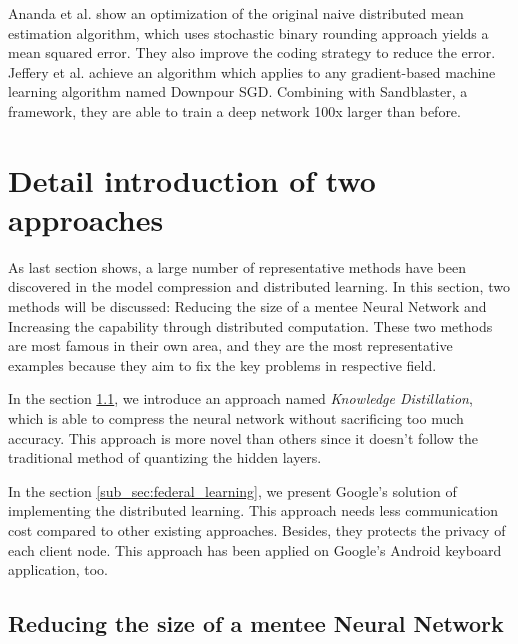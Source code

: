 \documentclass[article]{aaltoseries}
\begin{document}
Ananda et al.\cite{Suresh2016} show an optimization of the original naive distributed mean estimation algorithm, which uses 
stochastic binary rounding approach yields a mean squared error. They also improve the coding strategy to reduce the error.
Jeffery et al.\cite{NIPS2012_4687} achieve an algorithm which applies to any gradient-based 
machine learning algorithm named Downpour SGD.
Combining with Sandblaster, a framework, they are able to train a deep network 100x larger than before.







\section{Detail introduction of two approaches}
\label{sec:approaches}





As last section shows, a large number of representative methods have been discovered in the model compression and distributed learning. 
In this section, two methods will be discussed:
Reducing the size of a mentee Neural Network and Increasing the capability through distributed computation.
These two methods are most famous in their own area, and they are the most representative examples because they
aim to fix the key problems in respective field.

In the section \ref{sub_sec:reduce_size}, we introduce an approach named \emph{Knowledge Distillation},
which is able to compress the neural network without sacrificing too much accuracy. This approach is more novel
than others since it doesn't follow the traditional method of quantizing the hidden layers.


In the section \ref{sub_sec:federal_learning}, we present Google's solution of implementing the distributed
learning. This approach needs less communication cost compared to other existing approaches. Besides, they 
protects the privacy of each client node. This approach has been applied on Google's Android keyboard application,
too.


\subsection{Reducing the size of a mentee Neural Network}
\label{sub_sec:reduce_size}
\end{document}
